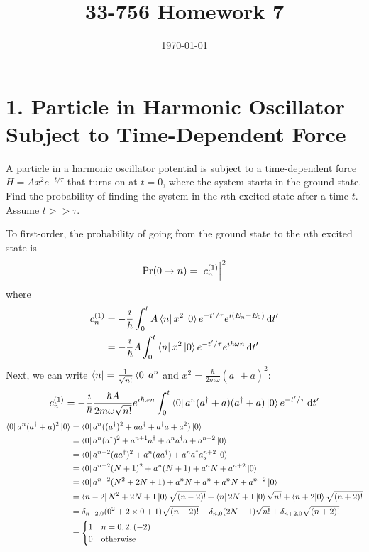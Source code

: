 \documentclass[a4paper,twoside]{article}
\title{33-756 Homework 7}
\date{\today}
\begin{document}
\maketitle

\section*{1. Particle in Harmonic Oscillator Subject to Time-Dependent Force}
A particle in a harmonic oscillator potential is subject to a time-dependent force $ H = A x^2 e^{- t / \tau} $ that turns on at $ t = 0 $, where the system starts in the ground state. Find the probability of finding the system in the $ n $th excited state after a time $ t $. Assume $ t >> \tau $.

\begin{problem}
    To first-order, the probability of going from the ground state to the $ n $th excited state is
    \begin{equation}
        \Pr(0 \to n) = \abs{c_n^{(1)}}^2
    \end{equation}
    where
    \begin{align}
        c_n^{(1)} &= - \frac{\imath}{\hbar} \int_0^{t} A\bra{n}x^2\ket{0} e^{-t' / \tau} e^{\imath (E_n - E_0)} \dd{t'} \\
        &= - \frac{\imath}{\hbar} A \int_0^t\bra{n} x^2\ket{0} e^{-t' / \tau} e^{\imath \hbar \omega n} \dd{t'}
    \end{align}
    Next, we can write $\bra{n} = \frac{1}{\sqrt{n!}}\bra{0} a^n $ and $ x^2 = \frac{\hbar}{2m \omega} (a^\dagger + a)^2 $:
    \begin{equation}
        c_n^{(1)} = - \frac{\imath}{\hbar} \frac{\hbar A}{2m \omega \sqrt{n!}} e^{\imath \hbar \omega n} \int_0^t\bra{0} a^n (a^\dagger + a)(a^\dagger + a)\ket{0} e^{-t' / \tau} \dd{t'}
    \end{equation}
    \begin{align}
        \bra{0} a^n (a^\dagger + a)^2\ket{0} &=\bra{0} a^n ( (a^\dagger)^2 + aa^\dagger + a^\dagger a + a^2)\ket{0} \\
        &=\bra{0} a^n (a^\dagger)^2 + a^{n+1} a^\dagger + a^n a^\dagger a + a^{n+2}\ket{0} \\
        &=\bra{0} a^{n-2} (a a^\dagger)^2 +a^{n} (a a^\dagger) + a^n a^\dagger a _ a^{n+2}\ket{0} \\
        &=\bra{0} a^{n-2} (N+1)^2 + a^{n} (N+1) + a^{n} N + a^{n+2}\ket{0} \\
        &=\bra{0} a^{n-2} (N^2 + 2 N + 1) + a^n N + a^n + a^n N + a^{n+2}\ket{0} \\
        &=\bra{n - 2} N^2 + 2N + 1\ket{0}\sqrt{(n-2)!} +\bra{n} 2N + 1\ket{0} \sqrt{n!} +\bra{n+2}\ket{0} \sqrt{(n+2)!} \\
        &= \delta_{n-2,0} (0^2 + 2\times 0 + 1) \sqrt{(n-2)!} + \delta_{n,0} (2N +1) \sqrt{n!} + \delta_{n+2,0} \sqrt{(n+2)!} \\
        &= \begin{cases} 1 & n = 0,2, (-2)\\ 0 & \text{otherwise} \end{cases}
   \end{align}


\end{problem}
\end{document}
